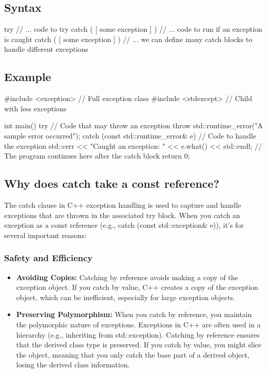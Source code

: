 \documentclass{report}
\begin{document}
    \bigbreak \noindent 
    \subsection{Syntax}
    \bigbreak \noindent 
    \begin{cppcode}
        try {
            // ... code to try
        } catch ( [ some exception ] ) {
            // ... code to run if an exception is caught
        } catch ( [ some exception ] ) {
            // ... we can define many catch blocks to handle different exceptions
        }
    \end{cppcode}

    \pagebreak 
    \subsection{Example}
    \bigbreak \noindent 
    \begin{cppcode}
        #include <exception> // Full exception class
        #include <stdexcept> // Child with less exceptions

        int main() {
            try {
                // Code that may throw an exception
                throw std::runtime_error("A sample error occurred");
            } catch (const std::runtime_error& e) {
                // Code to handle the exception
                std::cerr << "Caught an exception: " << e.what() << std::endl;
            }
            // The program continues here after the catch block
            return 0;
        }

    \end{cppcode}

    \bigbreak \noindent 
    \subsection{Why does catch take a const reference?}
    \bigbreak \noindent 
    The catch clause in C++ exception handling is used to capture and handle exceptions that are thrown in the associated try block. When you catch an exception as a const reference (e.g., catch (const std::exception& e)), it's for several important reasons:
    \bigbreak \noindent 
    \subsubsection{Safety and Efficiency}
    \begin{itemize}
        \item \textbf{Avoiding Copies:} Catching by reference avoids making a copy of the exception object. If you catch by value, C++ creates a copy of the exception object, which can be inefficient, especially for large exception objects.
        \item \textbf{Preserving Polymorphism:} When you catch by reference, you maintain the polymorphic nature of exceptions. Exceptions in C++ are often used in a hierarchy (e.g., inheriting from std::exception). Catching by reference ensures that the derived class type is preserved. If you catch by value, you might slice the object, meaning that you only catch the base part of a derived object, losing the derived class information.
    \end{itemize}
\end{document}
